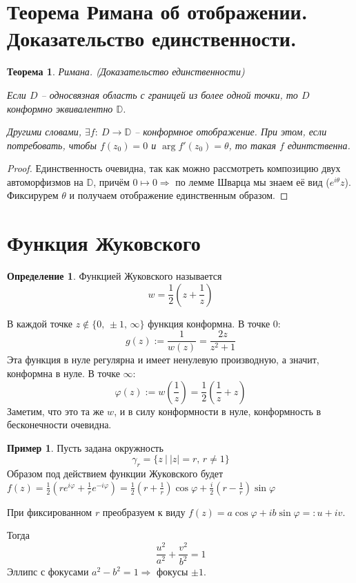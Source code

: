 \documentclass[a4paper,12pt]{article}
\renewcommand{\phi}{\ensuremath{\varphi}}
\theoremstyle{plain}
\newtheorem{theorem}{Теорема}[section]
\theoremstyle{definition}
\newtheorem{definition}{Определение}[section]
\newtheorem*{example}{Пример}
\theoremstyle{remark}
\begin{document}
\section{Теорема Римана об отображении. Доказательство единственности.}
\begin{theorem}
	Римана. (Доказательство единственности)

	Если $D$ -- односвязная область с границей из более одной точки, то $D$ конформно эквивалентно $\mathbb{D}$.

	Другими словами, $\exists f :\: D \to \mathbb{D}$ -- конформное отображение. При этом, если потребовать, чтобы $f(z_0) = 0$ и $\arg f'(z_0) = \theta$, то такая $f$ единтственна.
\end{theorem}

\begin{proof}
	Единственность очевидна, так как можно рассмотреть композицию двух  автоморфизмов на $\mathbb{D}$, причём $0 \mapsto 0 \Rightarrow$ по лемме Шварца мы знаем её вид ($e^{i\theta}z$). Фиксирурем $\theta$ и получаем отображение единственным образом.
\end{proof}

\section{Функция Жуковского}
\begin{definition}
	Функцией Жуковского называется
	\[
		w = \frac{1}{2}\left(z + \frac{1}{z}\right)
	\]
\end{definition}

В каждой точке $z \not\in \{0,\, \pm 1,\, \infty\}$ функция конформна. В точке $0$:
\[
	g(z) := \frac{1}{w(z)} = \frac{2z}{z^2 + 1}
\]
Эта функция в нуле регулярна и имеет ненулевую производную, а значит, конформна в нуле. В точке $\infty$:
\[
	\phi(z) := w\left(\frac{1}{z}\right) = \frac{1}{2}\left(\frac{1}{z} + z\right)
\]
Заметим, что это та же $w$, и в силу конформности в нуле, конформность в бесконечности очевидна.

\begin{example}
	Пусть задана окружность
	\[
		\gamma_r = \{z \:\vert\: \vert z\vert = r,\, r \neq 1\}
	\]
	Образом под действием функции Жуковского будет $f(z) = \frac{1}{2}\left(re^{i\phi} + \frac{1}{r}e^{-i\phi}\right) = \frac{1}{2}\left(r + \frac{1}{r}\right)\cos\phi + \frac{i}{2}\left(r - \frac{1}{r}\right)\sin\phi$

	При фиксированном $r$ преобразуем к виду $f(z) = a\cos\phi + ib\sin\phi =: u + iv$.

	Тогда
	\[
		\frac{u^2}{a^2} + \frac{v^2}{b^2} = 1
	\]
	Эллипс с фокусами $a^2 - b^2 = 1 \Rightarrow$ фокусы $\pm1$.
\end{example}
\end{document}
